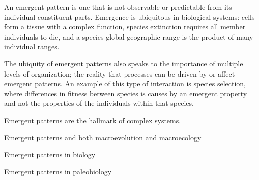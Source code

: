 

An emergent pattern is one that is not observable or predictable from its individual constituent parts. Emergence is ubiquitous in biological systems: cells form a tissue with a complex function, species extinction requires all member individuals to die, and a species global geographic range is the product of many individual ranges. 

The ubiquity of emergent patterns also speaks to the importance of multiple levels of organization; the reality that processes can be driven by or affect emergent patterns. An example of this type of interaction is species selection, where differences in fitness between species is causes by an emergent property and not the properties of the individuals within that species.

Emergent patterns are the hallmark of complex systems.

Emergent patterns and both macroevolution and macroecology

Emergent patterns in biology

Emergent patterns in paleobiology


